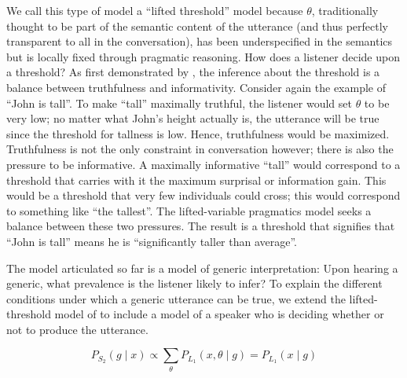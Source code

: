 \documentclass[10pt,letterpaper]{article}
\begin{document}
We call this type of model a ``lifted threshold'' model because $\theta$, traditionally thought to be part of the semantic content of the utterance (and thus perfectly transparent to all in the conversation), has been underspecified in the semantics but is locally fixed through pragmatic reasoning.
 How does a listener decide upon a threshold? As first demonstrated by , the inference about the threshold is a balance between truthfulness and informativity. Consider again the example of ``John is tall''. To make ``tall'' maximally truthful, the listener would set $\theta$ to be very low; no matter what John's height actually is, the utterance will be true since the threshold for tallness is low. Hence, truthfulness would be maximized. 
 Truthfulness is not the only constraint in conversation however; there is also the pressure to be informative. A maximally informative ``tall'' would correspond to a threshold that carries with it the maximum surprisal or information gain. 
 This would be a threshold that very few individuals could cross; this would correspond to something like ``the tallest''. 
 The lifted-variable pragmatics model seeks a balance between these two pressures. 
 The result is a threshold that signifies that ``John is tall'' means he is ``significantly taller than average''.
 
% 
The model articulated so far is a model of generic interpretation: Upon hearing a generic, what prevalence is the listener likely to infer? 
To explain the different conditions under which a generic utterance can be true, we extend the lifted-threshold model of  to include a model of a speaker who is deciding whether or not to produce the utterance. 

\begin{equation} 
P_{S_{2}}(g \mid x) \propto  \sum_{\theta} P_{L_{1}}(x , \theta \mid g) =  P_{L_{1}}(x \mid g)
\label{eq:S2}
\end{equation}
\end{document}
